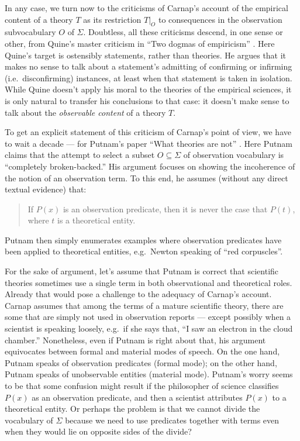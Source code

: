 In any case, we turn now to the criticisms of Carnap's account of the
empirical content of a theory $T$ as its restriction $T|_O$ to
consequences in the observation subvocabulary $O$ of $\Sigma$.
Doubtless, all these criticisms descend, in one sense or other, from
Quine's master criticism in ``Two dogmas of empiricism''
\citep{quine1951}.  Here Quine's target is ostensibly statements,
rather than theories.  He argues that it makes no sense to talk about
a statement's admitting of confirming or infirming (i.e.\
disconfirming) instances, at least when that statement is taken in
isolation.  While Quine doesn't apply his moral to the theories of the
empirical sciences, it is only natural to transfer his conclusions to
that case: it doesn't make sense to talk about the {\it observable
  content} of a theory $T$.

To get an explicit statement of this criticism of Carnap's point of
view, we have to wait a decade --- for Putnam's paper ``What theories
are not'' \citep{putnam1962}.  Here Putnam claims that the attempt to
select a subset $O\subseteq \Sigma$ of observation vocabulary is
``completely broken-backed.''  His argument focuses on showing the
incoherence of the notion of an observation term.  To this end, he
assumes (without any direct textual evidence) that:
\begin{quote}
  If $P(x)$ is an observation predicate, then it is never the case
  that $P(t)$, where $t$ is a theoretical entity. \end{quote} Putnam
then simply enumerates examples where observation predicates have been
applied to theoretical entities, e.g.\ Newton speaking of ``red
corpuscles''.

For the sake of argument, let's assume that Putnam is correct that
scientific theories sometimes use a single term in both observational
and theoretical roles.  Already that would pose a challenge to the
adequacy of Carnap's account.  Carnap assumes that among the terms of
a mature scientific theory, there are some that are simply not used in
observation reports --- except possibly when a scientist is speaking
loosely, e.g.\ if she says that, ``I saw an electron in the cloud
chamber.''  Nonetheless, even if Putnam is right about that, his
argument equivocates between formal and material modes of speech.  On
the one hand, Putnam speaks of observation predicates (formal mode);
on the other hand, Putnam speaks of unobservable entities (material
mode).  Putnam's worry seems to be that some confusion might result if
the philosopher of science classifies $P(x)$ as an observation
predicate, and then a scientist attributes $P(x)$ to a theoretical
entity.  Or perhaps the problem is that we cannot divide the
vocabulary of $\Sigma$ because we need to use predicates together with
terms even when they would lie on opposite sides of the divide?

